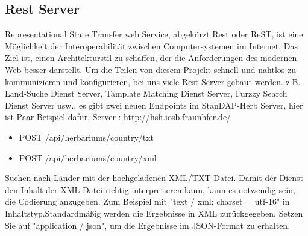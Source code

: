 \documentclass[10pt,a4paper]{report}
\begin{document}
\subsection{Rest Server}
Representational State Transfer web Service, abgekürzt Rest oder ReST, ist eine Möglichkeit der Interoperabilität zwischen Computersystemen im Internet. Das Ziel ist, einen Architekturstil zu schaffen, der die Anforderungen des modernen Web besser darstellt.
Um die Teilen von diesem Projekt schnell und nahtlos zu kommunizieren und konfigurieren, bei uns viele Rest Server gebaut werden. z.B. Land-Suche Dienst Server, Tamplate Matching Dienst Server, Furzzy Search Dienst Server usw..
es gibt zwei neuen Endpoints im StanDAP-Herb Server, hier ist Paar Beispiel dafür, Server : \href{http://hsh.iosb.fraunhfer.de/}{http://hsh.iosb.fraunhfer.de/}
\begin{itemize}
 \item POST /api/herbariums/country/txt
 \item POST /api/herbariums/country/xml
\end{itemize}
Suchen nach Länder mit der hochgeladenen XML/TXT Datei. Damit der Dienst den Inhalt der XML-Datei richtig interpretieren kann, kann es notwendig sein, die Codierung anzugeben. Zum Beispiel mit "text / xml; charset = utf-16" in Inhaltstyp.Standardmäßig werden die Ergebnisse in XML zurückgegeben. Setzen Sie auf "application / json", um die Ergebnisse im JSON-Format zu erhalten.
\end{document}
